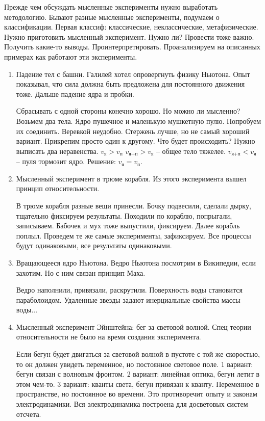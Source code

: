 \documentclass[a4paper, 12pt]{article}
\begin{document}
Прежде чем обсуждать мысленные эксперименты нужно выработать 
методологию. Бывают разные мысленные эксперименты, подумаем 
о классификации.
%
Первая классиф: классические, неклассические, метафизические.
%
Нужно приготовить мысленный эксперимент. Нужно ли? Провести тоже важно. 
Получить какие-то выводы. Проинтерпретировать.
%
Проанализируем на описанных примерах как работают эти эксперименты.
\begin{enumerate}
  \item Падение тел с башни.
    Галилей хотел опровергнуть физику Ньютона. Опыт показывал, что сила 
    должна быть предложена для постоянного движения тоже. Дальше падение 
    ядра и пробки.

    Сбрасывать с одной стороны конечно хорошо. Но можно ли мысленно?
    Возьмем два тела. Ядро пушечное и маленькую мушкетную пулю. 
    Попробуем их соединить. Веревкой неудобно. Стержень лучше, но не 
    самый хороший вариант. Прикрепим просто один к другому. Что будет 
    происходить? Нужно выписать два неравенства.
    $v_\text{я} > v_\text{п}$
    $v_\text{я+п} > v_\text{я}$ -- общее тело тяжелее.
    $v_\text{я+п} < v_\text{я}$ -- пуля тормозит ядро.
    Решение: $v_\text{я} = v_\text{п}$.

  \item Мысленный эксперимент в трюме корабля.
    Из этого эксперимента вышел принцип относительности.

    В трюме корабля разные вещи принесли. Бочку подвесили, сделали 
    дырку, тщательно фиксируем результаты. Походили по кораблю, 
    попрыгали, записываем. Бабочек и мух тоже выпустили, фиксируем.
    Далее корабль поплыл. Проведем те же самые эксперименты, 
    зафиксируем. Все процессы будут одинаковыми, все результаты 
    одинаковыми.

  \item Вращающееся ядро Ньютона.
    Ведро Ньютона посмотрим в Википедии, если захотим.
    Но с ним связан принцип Маха.

    Ведро наполнили, привязали, раскрутили. Поверхность воды становится 
    параболоидом. Удаленные звезды задают инерциальные свойства массы 
    воды...

  \item Мысленный эксперимент Эйнштейна: бег за световой волной.
    Спец теории относительности не было на время создания эксперимента.

    Если бегун будет двигаться за световой волной в пустоте с той же 
    скоростью, то он должен увидеть переменное, но постоянное световое 
    поле.
    1 вариант: бегун связан с волновым фронтом.
    2 вариант: линейная оптика, бегун летит в этом чем-то.
    3 вариант: кванты света, бегун привязан к кванту.
    Переменное в пространстве, но постоянное во времени. Это 
    противоречит опыту и законам электродинамики. Вся электродинамика 
    построена для досветовых систем отсчета.


\end{enumerate}
\end{document}
